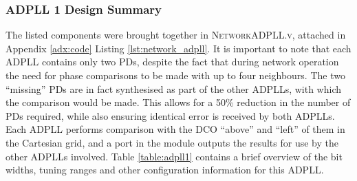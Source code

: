 \subsubsection{\acs{ADPLL} 1 Design Summary}
The listed components were brought together in \textsc{NetworkADPLL.v}, attached in Appendix \ref{adx:code} Listing \ref{lst:network_adpll}. It is important to note that each \ac{ADPLL} contains only two \aclp{PD}, despite the fact that during network operation the need for phase comparisons to be made with up to four neighbours. The two ``missing'' \acp{PD} are in fact synthesised as part of the other \acp{ADPLL}, with which the comparison would be made. This allows for a 50\% reduction in the number of \acp{PD} required, while also ensuring identical error is received by both \acp{ADPLL}. Each \ac{ADPLL} performs comparison with the \ac{DCO} ``above'' and ``left'' of them in the Cartesian grid, and a port in the module outputs the results for use by the other \acp{ADPLL} involved.
Table \ref{table:adpll1} contains a brief overview of the bit widths, tuning ranges and other configuration information for this \ac{ADPLL}.
